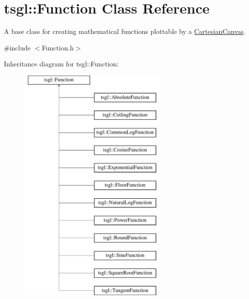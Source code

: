 \hypertarget{classtsgl_1_1_function}{\section{tsgl\-:\-:Function Class Reference}
\label{classtsgl_1_1_function}
}


A base class for creating mathematical functions plottable by a \hyperlink{classtsgl_1_1_cartesian_canvas}{Cartesian\-Canvas}.  




{\ttfamily \#include $<$Function.\-h$>$}

Inheritance diagram for tsgl\-:\-:Function\-:\begin{figure}[H]
\begin{center}
\leavevmode
\includegraphics[height=12.000000cm]{classtsgl_1_1_function}
\end{center}
\end{figure}
